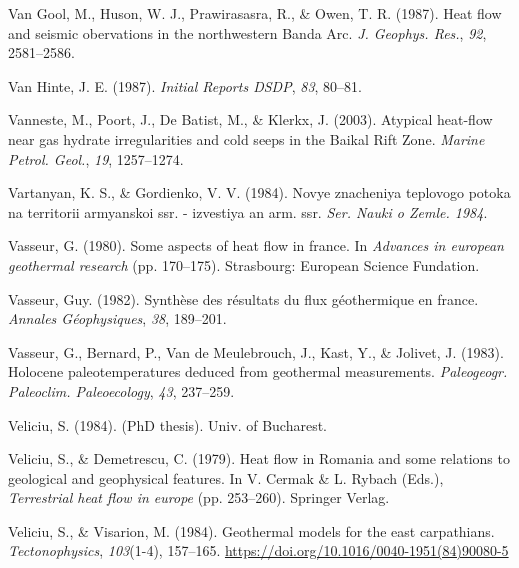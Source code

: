 \documentclass[draft,linenumbers]{agujournal2018}
\begin{document}
\leavevmode{}%
Van Gool, M., Huson, W. J., Prawirasasra, R., \& Owen, T. R. (1987).
Heat flow and seismic obervations in the northwestern {Banda Arc}.
\emph{J. Geophys. Res.}, \emph{92}, 2581--2586.

\leavevmode{}%
Van Hinte, J. E. (1987). \emph{Initial Reports DSDP}, \emph{83}, 80--81.

\leavevmode{}%
Vanneste, M., Poort, J., De Batist, M., \& Klerkx, J. (2003). Atypical
heat-flow near gas hydrate irregularities and cold seeps in the {Baikal
Rift Zone}. \emph{Marine Petrol. Geol.}, \emph{19}, 1257--1274.

\leavevmode{}%
Vartanyan, K. S., \& Gordienko, V. V. (1984). Novye znacheniya teplovogo
potoka na territorii armyanskoi ssr. - izvestiya an arm. ssr. \emph{Ser.
Nauki o Zemle. 1984}.

\leavevmode{}%
Vasseur, G. (1980). Some aspects of heat flow in france. In
\emph{Advances in european geothermal research} (pp. 170--175).
Strasbourg: European Science Fundation.

\leavevmode{}%
Vasseur, Guy. (1982). Synthèse des résultats du flux géothermique en
france. \emph{Annales Géophysiques}, \emph{38}, 189--201.

\leavevmode{}%
Vasseur, G., Bernard, P., Van de Meulebrouch, J., Kast, Y., \& Jolivet,
J. (1983). Holocene paleotemperatures deduced from geothermal
measurements. \emph{Paleogeogr. Paleoclim. Paleoecology}, \emph{43},
237--259.

\leavevmode{}%
Veliciu, S. (1984). (PhD thesis). Univ. of Bucharest.

\leavevmode{}%
Veliciu, S., \& Demetrescu, C. (1979). Heat flow in {Romania} and some
relations to geological and geophysical features. In V. Cermak \& L.
Rybach (Eds.), \emph{Terrestrial heat flow in europe} (pp. 253--260).
Springer Verlag.

\leavevmode{}%
Veliciu, S., \& Visarion, M. (1984). Geothermal models for the east
carpathians. \emph{Tectonophysics}, \emph{103}(1-4), 157--165.
\url{https://doi.org/10.1016/0040-1951(84)90080-5}
\end{document}
